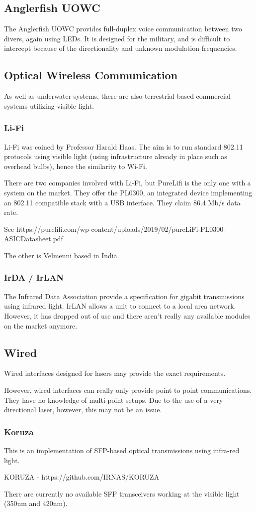 \documentclass{article}
\begin{document}
\subsection{Anglerfish \ac{UOWC}}
The Anglerfish \ac{UOWC} provides full-duplex voice communication between two divers, again using \ac{LED}s. It is designed for the military, and is difficult to intercept because of the directionality and unknown modulation frequencies.

\subsection{Optical Wireless Communication}
As well as underwater systems, there are also terrestrial based commercial systems utilizing visible light.

\subsubsection{Li-Fi}
Li-Fi was coined by Professor Harald Haas. The aim is to run standard 802.11 protocols using visible light (using infrastructure already in place such as overhead bulbs), hence the similarity to Wi-Fi.

There are two companies involved with Li-Fi, but PureLifi is the only one with a system on the market. They offer the PL0300, an integrated device implementing an 802.11 compatible stack with a USB interface. They claim 86.4 Mb/s data rate.

See https://purelifi.com/wp-content/uploads/2019/02/pureLiFi-PL0300-ASICDatasheet.pdf

The other is Velmenni based in India.

\subsubsection{IrDA / IrLAN}
The Infrared Data Association provide a specification for gigabit transmissions using infrared light. IrLAN allows a unit to connect to a local area network. However, it has dropped out of use and there aren't really any available modules on the market anymore.

\subsection{Wired}
Wired interfaces designed for lasers may provide the exact requirements.

However, wired interfaces can really only provide point to point communications. They have no knowledge of multi-point setups. Due to the use of a very directional laser, however, this may not be an issue.

\subsubsection{Koruza}
This is an implementation of \ac{SFP}-based optical transmissions using infra-red light.

KORUZA - https://github.com/IRNAS/KORUZA

There are currently no available \ac{SFP} transceivers working at the visible light (350nm and 420nm).



\end{document}
